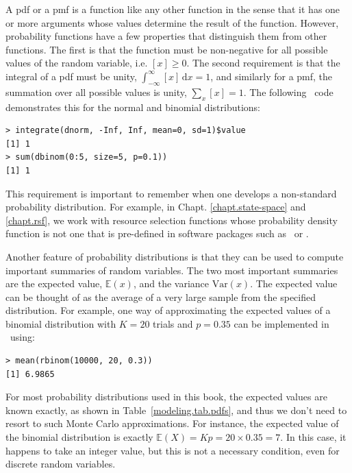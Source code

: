 A pdf or a pmf is a function like any other function
in the sense that it has one or more arguments whose values determine
the result of the function. However, probability functions have a few
properties that distinguish them from other functions.
The first is that the function
must be non-negative for all possible values of the random variable,
i.e. $[x] \geq 0$. The second requirement is that the integral of
a pdf must be unity, $\int_{-\infty}^{\infty} [x]\, \text{d}{x} = 1$, and similarly
for a pmf, the summation over all possible values is unity, $\sum_x [x]
= 1$. The following \R~code demonstrates
this for the normal and binomial distributions:
\begin{verbatim}
> integrate(dnorm, -Inf, Inf, mean=0, sd=1)$value
[1] 1
> sum(dbinom(0:5, size=5, p=0.1))
[1] 1
\end{verbatim}
This requirement is important to remember when one  develops a
non-standard probability distribution. For example, in Chapt.
\ref{chapt.state-space} and \ref{chapt.rsf},
we work with resource selection functions whose probability
density function is not one that is pre-defined in software packages
such as \R~or \bugs.

Another feature of probability distributions is that they can be used
to compute important summaries of random variables. The two most
important summaries are the expected value, $\mathbb{E}(x)$,
and the variance $\text{Var}(x)$. The expected value
can be thought of as the average
of a very large sample from the specified distribution. For
example,
one way of approximating the expected values of a binomial
distribution with $K=20$ trials and $p=0.35$ can be implemented in \R~using:
\begin{verbatim}
> mean(rbinom(10000, 20, 0.3))
[1] 6.9865
\end{verbatim}
For most probability distributions used in this book, the expected
values are known exactly, as shown in Table~\ref{modeling.tab.pdfs}, and
thus we don't need to resort to such Monte Carlo approximations. For instance, the
expected value of the binomial distribution is exactly $\mathbb{E}(X) = Kp =
20 \times 0.35 = 7$. In this case, it happens to take an integer
value, but this is not a necessary condition, even for discrete random
variables.

